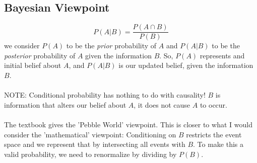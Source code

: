 \documentclass[12pt]{article} %
\begin{document}
\subsection{Bayesian Viewpoint}
$$P(A|B) = \frac{P(A\cap B)}{P(B)}$$
we consider $P(A)$ to be the \emph{prior} probability of $A$ and $P(A|B)$ to be the \emph{posterior} probability of $A$ given the information $B$. So, $P(A)$ represents and initial belief about $A$, and $P(A|B)$ is our updated belief, given the information $B$.\\\\
NOTE: Conditional probability has nothing to do with causality! $B$ is information that alters our belief about $A$, it does not cause $A$ to occur.\\\\
The textbook gives the 'Pebble World' viewpoint. This is closer to what I would consider the 'mathematical' viewpoint: Conditioning on $B$ restricts the event space and we represent that by intersecting all events with $B$. To make this a valid probability, we need to renormalize by dividing by $P(B)$.
\end{document}
